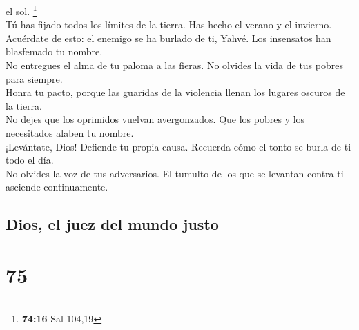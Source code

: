 el sol. \footnote{\textbf{74:16} Sal 104,19}\\
 Tú has fijado todos los límites de la tierra. Has hecho
el verano y el invierno.\\
 Acuérdate de esto: el enemigo se ha burlado de ti,
Yahvé. Los insensatos han blasfemado tu nombre.\\
 No entregues el alma de tu paloma a las fieras. No
olvides la vida de tus pobres para siempre.\\
 Honra tu pacto, porque las guaridas de la violencia
llenan los lugares oscuros de la tierra.\\
 No dejes que los oprimidos vuelvan avergonzados. Que los
pobres y los necesitados alaben tu nombre.\\
 ¡Levántate, Dios! Defiende tu propia causa. Recuerda
cómo el tonto se burla de ti todo el día.\\
 No olvides la voz de tus adversarios. El tumulto de los
que se levantan contra ti asciende continuamente.

\hypertarget{dios-el-juez-del-mundo-justo}{%
\subsection{Dios, el juez del mundo
justo}\label{dios-el-juez-del-mundo-justo}}

\hypertarget{section-73}{%
\section{75}\label{section-73}}

